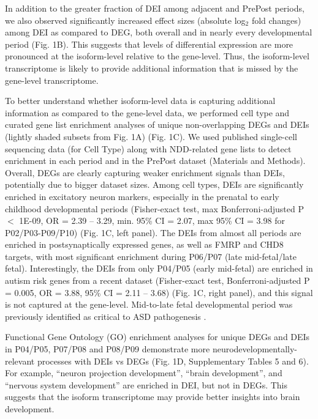\documentclass[12pt,chapterheads,final]{ucsd}
\begin{document}
In addition to the greater fraction of DEI among adjacent and PrePost periods, we also observed significantly increased effect sizes (absolute log$_2$ fold changes) among DEI as compared to DEG, both overall and in nearly every developmental period (Fig. 1B). This suggests that levels of differential expression are more pronounced at the isoform-level relative to the gene-level. Thus, the isoform-level transcriptome is likely to provide additional information that is missed by the gene-level transcriptome. \par
To better understand whether isoform-level data is capturing additional information as compared to the gene-level data, we performed cell type and curated gene list enrichment analyses of unique non-overlapping DEGs and DEIs (lightly shaded subsets from Fig. 1A) (Fig. 1C). We used published single-cell sequencing data (for Cell Type) along with NDD-related gene lists to detect enrichment in each period and in the PrePost dataset (Materials and Methods). Overall, DEGs are clearly capturing weaker enrichment signals than DEIs, potentially due to bigger dataset sizes. Among cell types, DEIs are significantly enriched in excitatory neuron markers, especially in the prenatal to early childhood developmental periods (Fisher-exact test, max Bonferroni-adjusted P $<$ 1E-09, OR = 2.39 – 3.29, min. 95\% CI = 2.07, max 95\% CI = 3.98 for P02/P03-P09/P10) (Fig. 1C, left panel). The DEIs from almost all periods are enriched in postsynaptically expressed genes, as well as FMRP and CHD8 targets, with most significant enrichment during P06/P07 (late mid-fetal/late fetal). Interestingly, the DEIs from only P04/P05 (early mid-fetal) are enriched in autism risk genes from a recent dataset \cite{Satterstrom2019} (Fisher-exact test, Bonferroni-adjusted P = 0.005, OR = 3.88, 95\% CI = 2.11 – 3.68) (Fig. 1C, right panel), and this signal is not captured at the gene-level. Mid-to-late fetal developmental period was previously identified as critical to ASD pathogenesis \cite{Lin2015,Parikshak2013}. \par
Functional Gene Ontology (GO) enrichment analyses for unique DEGs and DEIs in P04/P05, P07/P08 and P08/P09 demonstrate more neurodevelopmentally-relevant processes with DEIs vs DEGs (Fig. 1D, Supplementary Tables 5 and 6). For example, “neuron projection development”, “brain development”, and “nervous system development” are enriched in DEI, but not in DEGs. This suggests that the isoform transcriptome may provide better insights into brain development.
\end{document}

